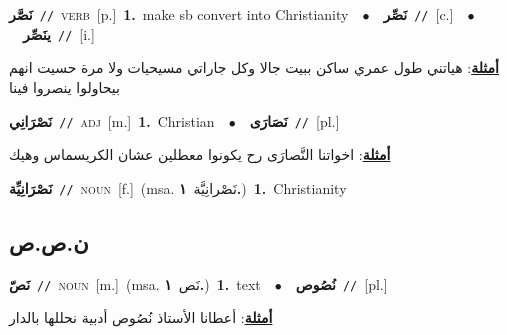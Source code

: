 \documentclass[10pt,a4paper,twoside]{article} %
\begin{document}
\begin{multicols}{2}
{\setlength\topsep{0pt}\textbf{\foreignlanguage{arabic}{نَصَّر}}\ {\color{gray}\texttt{//}\color{black}}\ \textsc{verb}\ [p.]\ \textbf{1.}~make sb convert into Christianity\ \ $\bullet$\ \ \setlength\topsep{0pt}\textbf{\foreignlanguage{arabic}{نَصِّر}}\ {\color{gray}\texttt{//}\color{black}}\ [c.]\ \ $\bullet$\ \ \setlength\topsep{0pt}\textbf{\foreignlanguage{arabic}{ينَصِّر}}\ {\color{gray}\texttt{//}\color{black}}\ [i.]\  \begin{flushright}\color{gray}\foreignlanguage{arabic}{\textbf{\underline{\foreignlanguage{arabic}{أمثلة}}}: هياتني طول عمري ساكن ببيت جالا وكل جاراتي مسيحيات ولا مرة حسيت انهم بيحاولوا ينصروا فينا}\end{flushright}\color{black}} \vspace{2mm}

{\setlength\topsep{0pt}\textbf{\foreignlanguage{arabic}{نَصْرَانِي}}\ {\color{gray}\texttt{//}\color{black}}\ \textsc{adj}\ [m.]\ \textbf{1.}~Christian\ \ $\bullet$\ \ \setlength\topsep{0pt}\textbf{\foreignlanguage{arabic}{نَصَارَى}}\ {\color{gray}\texttt{//}\color{black}}\ [pl.]\  \begin{flushright}\color{gray}\foreignlanguage{arabic}{\textbf{\underline{\foreignlanguage{arabic}{أمثلة}}}: اخواتنا النَّصارَى رح يكونوا معطلين عشان الكريسماس وهيك}\end{flushright}\color{black}} \vspace{2mm}

{\setlength\topsep{0pt}\textbf{\foreignlanguage{arabic}{نَصْرَانِيِّة}}\ {\color{gray}\texttt{//}\color{black}}\ \textsc{noun}\ [f.]\ \color{gray}(msa. \foreignlanguage{arabic}{نَصْرانِيَّة}~\foreignlanguage{arabic}{\textbf{١.}})\color{black}\ \textbf{1.}~Christianity\ } \vspace{2mm}

\vspace{-3mm}
\subsection*{\color{blue}\foreignlanguage{arabic}{ن.ص.ص}\color{blue}{}} 

{\setlength\topsep{0pt}\textbf{\foreignlanguage{arabic}{نَصّ}}\ {\color{gray}\texttt{//}\color{black}}\ \textsc{noun}\ [m.]\ \color{gray}(msa. \foreignlanguage{arabic}{نَص}~\foreignlanguage{arabic}{\textbf{١.}})\color{black}\ \textbf{1.}~text\ \ $\bullet$\ \ \setlength\topsep{0pt}\textbf{\foreignlanguage{arabic}{نُصُوص}}\ {\color{gray}\texttt{//}\color{black}}\ [pl.]\  \begin{flushright}\color{gray}\foreignlanguage{arabic}{\textbf{\underline{\foreignlanguage{arabic}{أمثلة}}}: أعطانا الأستاذ نُصُوص أدبية نحللها بالدار}\end{flushright}\color{black}} \vspace{2mm}


\end{multicols}
\end{document}
